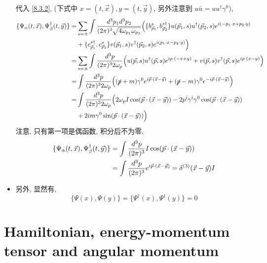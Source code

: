 \begin{itemize}
	\begin{tcolorbox}[title=calculation:]
		代入 \eqref{8.3.2}, (下式中 $x = (t, \vec{x}), y = (t, \vec{y})$, 另外注意到 $u \bar{u} = u u^\dag \gamma^0$),
		\begin{align}
			\{\Psi_\alpha(t, \vec{x}), \Psi^\dag_\beta(t, \vec{y})\} =& \sum_{s = \pm} \int \frac{d^3 p_1 d^3 p_2}{(2 \pi)^3 \sqrt{4 \omega_{p_1} \omega_{p_2}}} \Big( \{b^s_{\vec{p}_1}, b^{s \dag}_{\vec{p}_2}\} u(\vec{p}_1, s) u^\dag(\vec{p}_2, s) e^{i (- p_1 \cdot x + p_2 \cdot y)} \notag \\
			& + \{c^{s \dag}_{\vec{p}_1}, c^s_{\vec{p}_2}\} v(\vec{p}_1, s) v^\dag(\vec{p}_2, s) e^{i (p_1 \cdot x - p_2 \cdot y)} \Big) \notag \\
			=& \sum_{s = \pm} \int \frac{d^3 p}{(2 \pi)^3 2 \omega_p} \Big( u(\vec{p}, s) u^\dag(\vec{p}, s) e^{i p \cdot (- x + y)} + v(\vec{p}, s) v^\dag(\vec{p}, s) e^{i p \cdot (x - y)} \Big) \notag \\
			=& \int \frac{d^3 p}{(2 \pi)^3 2 \omega_p} \Big( (\cancel{p} + m) \gamma^0 e^{i \vec{p} \cdot (\vec{x} - \vec{y})} + (\cancel{p} - m) \gamma^0 e^{- i \vec{p} \cdot (\vec{x} - \vec{y})} \Big) \notag \\
			=& \int \frac{d^3 p}{(2 \pi)^3 2 \omega_p} \Big( 2 \omega_p I \cos(\vec{p} \cdot (\vec{x} - \vec{y})) - 2 p^i \gamma^i \gamma^0 \cos(\vec{p} \cdot (\vec{x} - \vec{y})) \notag \\
			& + 2 i m \gamma^0 \sin(\vec{p} \cdot (\vec{x} - \vec{y})) \Big)
		\end{align}
		注意, 只有第一项是偶函数, 积分后不为零,
		\begin{align}
			\{\Psi_\alpha(t, \vec{x}), \Psi^\dag_\beta(t, \vec{y})\} &= \int \frac{d^3 p}{(2 \pi)^3} I \cos(\vec{p} \cdot (\vec{x} - \vec{y})) \notag \\
			&= \int \frac{d^3 p}{(2 \pi)^3} e^{i \vec{p} \cdot (\vec{x} - \vec{y})} = \delta^{(3)}(\vec{x} - \vec{y}) I
		\end{align}
	\end{tcolorbox}
	
	\item 另外, 显然有,
	\begin{equation}
		\{\Psi(x), \Psi(y)\} = \{\Psi^\dag(x), \Psi^\dag(y)\} = 0
	\end{equation}
\end{itemize}

\section{Hamiltonian, energy-momentum tensor and angular momentum}

